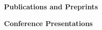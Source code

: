 \documentclass[11pt]{article}
\begin{document}
   
  {\large \textbf{Publications and Preprints}}


  
  
    
    


  


  {\large \textbf{Conference Presentations}}
\end{document}
